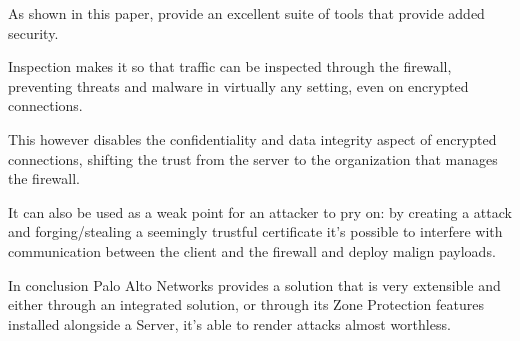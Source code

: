 As shown in this paper,  provide an excellent suite of tools that provide added security.

 Inspection makes it so that traffic can be inspected through the firewall, preventing threats and malware in virtually any setting, even on encrypted connections.

This however disables the confidentiality and data integrity aspect of  encrypted connections, shifting the trust from the server to the organization that manages the firewall.

It can also be used as a weak point for an attacker to pry on: by creating a  attack and forging/stealing a seemingly trustful certificate it's possible to interfere with communication between the client and the firewall and deploy malign payloads.

In conclusion Palo Alto Networks provides a  solution that is very extensible and either through an integrated  solution, or through its Zone Protection features installed alongside a  Server, it's able to render  attacks almost worthless.

\newpage
\cleardoublepage



\newpage
\cleardoublepage
\listoffigures%






